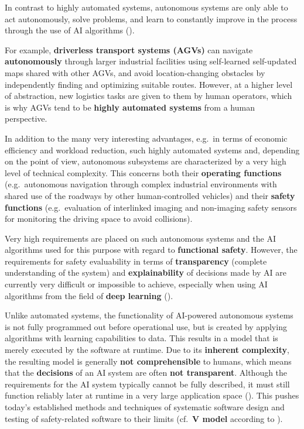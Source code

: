 \documentclass [oneside,10pt,a4paper,ngerman,BCOR10mm,headsepline,parindent,final]{scrartcl}
\begin{document}
In contrast to highly automated systems, autonomous systems are only
able to act autonomously, solve problems, and learn to constantly
improve in the process through the use of AI algorithms
(\cite{acatech_2017}).

For example, \textbf{driverless transport systems (AGVs)} can navigate
\textbf{autonomously} through larger industrial facilities using
self-learned self-updated maps shared with other AGVs, and avoid
location-changing obstacles by independently finding and optimizing
suitable routes. However, at a higher level of abstraction, new
logistics tasks are given to them by human operators, which is why AGVs
tend to be \textbf{highly automated systems} from a human perspective.

In addition to the many very interesting advantages, e.g.~in terms of
economic efficiency and workload reduction, such highly automated
systems and, depending on the point of view, autonomous subsystems are
characterized by a very high level of technical complexity. This
concerns both their \textbf{operating functions} (e.g.~autonomous
navigation through complex industrial environments with shared use of
the roadways by other human-controlled vehicles) and their
\textbf{safety functions} (e.g.~evaluation of interlinked imaging and
non-imaging safety sensors for monitoring the driving space to avoid
collisions).

Very high requirements are placed on such autonomous systems and the AI
algorithms used for this purpose with regard to \textbf{functional
safety}. However, the requirements for safety evaluability in terms of
\textbf{transparency} (complete understanding of the system) and
\textbf{explainability} of decisions made by AI are currently very
difficult or impossible to achieve, especially when using AI algorithms
from the field of \textbf{deep learning} (\cite{Liggesmeyer_2019}).

Unlike automated systems, the functionality of AI-powered autonomous
systems is not fully programmed out before operational use, but is
created by applying algorithms with learning capabilities to data. This
results in a model that is merely executed by the software at runtime.
Due to its \textbf{inherent complexity}, the resulting model is
generally \textbf{not comprehensible} to humans, which means that the
\textbf{decisions} of an AI system are often \textbf{not transparent}.
Although the requirements for the AI system typically cannot be fully
described, it must still function reliably later at runtime in a very
large application space (\cite{Schneider_2021}). This pushes today's
established methods and techniques of systematic software design and
testing of safety-related software to their limits (cf.~\textbf{V model}
according to \cite{DIN_EN_61508-3_2011-02}).
\end{document}
